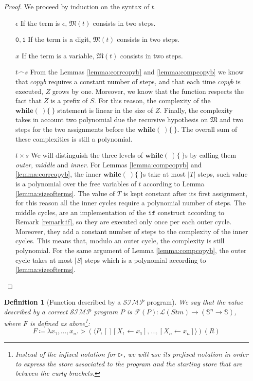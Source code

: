 \documentclass[10pt]{amsart}
\newcommand{\SIMP}{\mathcal{SIMP}}
\newcommand{\conc}{\frown}
\newcommand{\zero}{\mathtt{0}}
\newcommand{\one}{\mathtt{1}}
\newcommand{\vone}{x}
\renewcommand{\SS}{\mathbb{S}}
\newcommand{\If}{\mathtt{if}}
\newcommand{\lang}[1]{\mathcal L(#1)}
\newcommand{\while}[2]{\mathbf{while}(#1)\{#2\}}
\newcommand{\as}[2]{[#1 \leftarrow #2]}
\newcommand{\ssos}{\triangleright}
\newcommand{\MM}{\mathfrak M}
\newtheorem{defn}{Definition}
\begin{document}
\begin{proof}
We proceed by induction on the syntax of $t$.
\begin{itemize}
\item[$\epsilon$] If the term is $\epsilon$, $\MM(t)$ consists in two steps.
\item[$\zero,\one$] If the term is a digit,  $\MM(t)$ consists in two steps.
\item[$\vone$] If the term is a variable, $\MM(t)$ consists in two steps.
\item[$t \conc s$] From the Lemmas \ref{lemma:corrcopyb} and \ref{lemma:compcopyb} we know that $copyb$ requires a constant number of steps, and that each time $copyb$ is executed, $Z$ grows by one. Moreover, we know that the function respects the fact that $Z$ is a prefix of $S$. For this reason, the complexity of the $\while\ \ $ statement is linear in the size of $Z$. Finally, the complexity takes in account two polynomial due the recursive hypothesis on $\MM$ and two steps for the two assignments before the $\while\ \ $. The overall sum of these complexities is still a polynomial.
\item[$t \times s$] We will distinguish the three levels of $\while\ \ $s by calling them \emph{outer}, \emph{middle} and \emph{inner}. For Lemmas \ref{lemma:compcopyb} and \ref{lemma:corrcopyb}, the inner $\while\ \ $s take at most $|T|$ steps, such value is a polynomial over the free variables of $t$ according to Lemma \ref{lemma:sizeofterms}. The value of $T$ is kept constant after its first assignment, for this reason all the inner cycles require a polynomial number of steps. The middle cycles, are an implementation of the $\If$ construct according to Remark \ref{remark:if}, so they are executed only once per each outer cycle. Moreover, they add a constant number of steps to the complexity of the inner cycles. This means that, modulo an outer cycle, the complexity is still polynomial. For the same argument of Lemma \ref{lemma:compcopyb}, the outer cycle takes at most $|S|$ steps which is a polynomial according to \ref{lemma:sizeofterms}.
\end{itemize}
\end{proof}

\begin{defn}[Function described by a $\SIMP$ program]
We say that the value described by a correct $\SIMP$ program $P$ is $\mathcal F(P): \lang{Stm} \longrightarrow (\SS^n \longrightarrow \SS)$, where $F$ is defined as above\footnote{Instead of the infixed notation for $\ssos$, we will use its prefixed notation in order to express the store associated to the program and the starting store that are between the curly brackets.}:
\[
F\coloneqq \lambda x_1, \ldots, x_n.\ssos(\langle P, []\as {X_1} {\vone_1}, \ldots, \as {X_n} {\vone_n} \rangle)(R)
\]
\end{defn}
\end{document}
